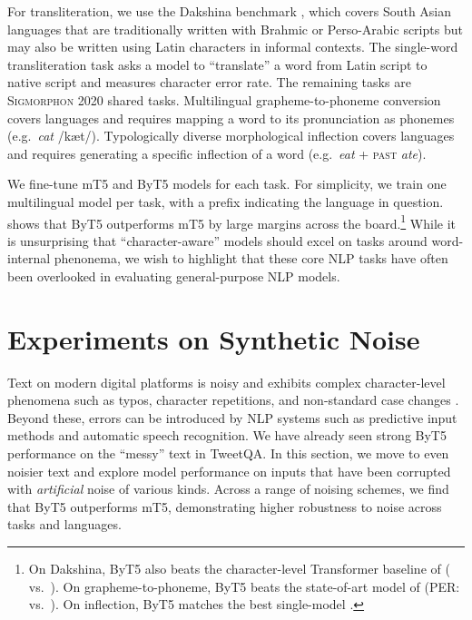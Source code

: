 \documentclass[11pt,a4paper]{article}
\begin{document}
For transliteration, we use the Dakshina benchmark \cite{roark-etal-2020-processing}, which covers  South Asian languages that are traditionally written with Brahmic or Perso-Arabic scripts but may also be written using Latin characters in informal contexts. The single-word transliteration task asks a model to ``translate'' a word from Latin script to native script and measures character error rate. The remaining tasks are \textsc{Sigmorphon} 2020 shared tasks. Multilingual grapheme-to-phoneme conversion \cite{gorman-etal-2020-sigmorphon} covers  languages and requires mapping a word to its pronunciation as phonemes (e.g.~\textit{cat}  /k\ae{}t/). Typologically diverse morphological inflection \cite{vylomova-etal-2020-sigmorphon} covers  languages and requires generating a specific inflection of a word (e.g.~\textit{eat} + \textsc{past}  \textit{ate}).

We fine-tune mT5 and ByT5 models for each task. For simplicity, we train one multilingual model per task, with a prefix indicating the language in question.  shows that ByT5 outperforms mT5 by large margins across the board.\footnote{On Dakshina, ByT5 also beats the character-level Transformer baseline of \citet{roark-etal-2020-processing} ( vs.~). On grapheme-to-phoneme, ByT5 beats the state-of-art model of \citet{yu-etal-2020-ensemble} (PER:  vs.~). On inflection, ByT5 matches the best single-model \cite{peters-martins-2020-one}.} While it is unsurprising that ``character-aware'' models should excel on tasks around word-internal phenonema, we wish to highlight that these core NLP tasks have often been overlooked in evaluating general-purpose NLP models.

\section{Experiments on Synthetic Noise}
\label{sec:noise}

Text on modern digital platforms is noisy and exhibits complex character-level phenomena such as typos, character repetitions, and non-standard case changes \cite{caswell2020language}. Beyond these, errors can be introduced by NLP systems such as predictive input methods and automatic speech recognition. We have already seen strong ByT5 performance on the ``messy'' text in TweetQA. In this section, we move to even noisier text and explore model performance on inputs that have been corrupted with \emph{artificial} noise of various kinds. Across a range of noising schemes, we find that ByT5 outperforms mT5, demonstrating higher robustness to noise across tasks and languages.
\end{document}
